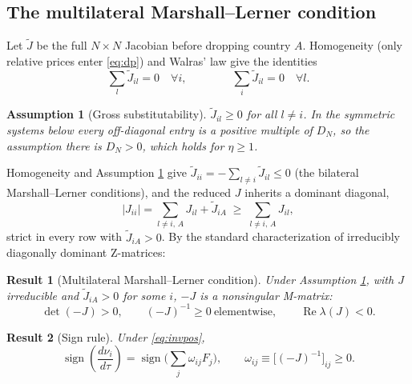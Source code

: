\documentclass[11pt]{article}
\newtheorem{result}{Result}[section]
\newtheorem{assumption}{Assumption}
\begin{document}
\subsection{The multilateral Marshall--Lerner condition}

Let $\widetilde J$ be the full $N \times N$ Jacobian before dropping country $A$. Homogeneity (only relative prices enter \eqref{eq:dp}) and Walras' law give the identities
\begin{equation}
\sum_{l} \widetilde J_{il} = 0 \quad \forall i,
\qquad\qquad
\sum_{i} \widetilde J_{il} = 0 \quad \forall l .
\label{eq:hom}
\end{equation}

\begin{assumption}[Gross substitutability]
$\widetilde J_{il} \geq 0$ for all $l \neq i$. In the symmetric systems below every off-diagonal entry is a positive multiple of $D_N$, so the assumption there is $D_N > 0$, which holds for $\eta \geq 1$.
\label{as:gs}
\end{assumption}

Homogeneity and Assumption \ref{as:gs} give $\widetilde J_{ii} = -\sum_{l\neq i}\widetilde J_{il} \leq 0$ (the bilateral Marshall--Lerner conditions), and the reduced $J$ inherits a dominant diagonal,
\begin{equation}
|J_{ii}| = \sum_{l \neq i,\,A} J_{il} + \widetilde J_{iA} \;\geq\; \sum_{l \neq i,\,A} J_{il} ,
\label{eq:diagdom}
\end{equation}
strict in every row with $\widetilde J_{iA} > 0$. By the standard characterization of irreducibly diagonally dominant Z-matrices:

\begin{result}[Multilateral Marshall--Lerner condition]
Under Assumption \ref{as:gs}, with $J$ irreducible and $\widetilde J_{iA} > 0$ for some $i$, $-J$ is a nonsingular M-matrix:
\begin{equation}
\det(-J) > 0,
\qquad
(-J)^{-1} \geq 0 \ \text{elementwise},
\qquad
\operatorname{Re}\lambda(J) < 0 .
\label{eq:invpos}
\end{equation}
\label{res:mml}
\end{result}

\begin{result}[Sign rule]
Under \eqref{eq:invpos},
\begin{equation}
\operatorname{sign}\!\left( \frac{d\nu_i}{d\tau} \right)
= \operatorname{sign}\!\Big( \sum_j \omega_{ij} F_j \Big),
\qquad \omega_{ij} \equiv \big[(-J)^{-1}\big]_{ij} \geq 0 .
\label{eq:signrule}
\end{equation}
\label{res:signrule}
\end{result}
\end{document}
